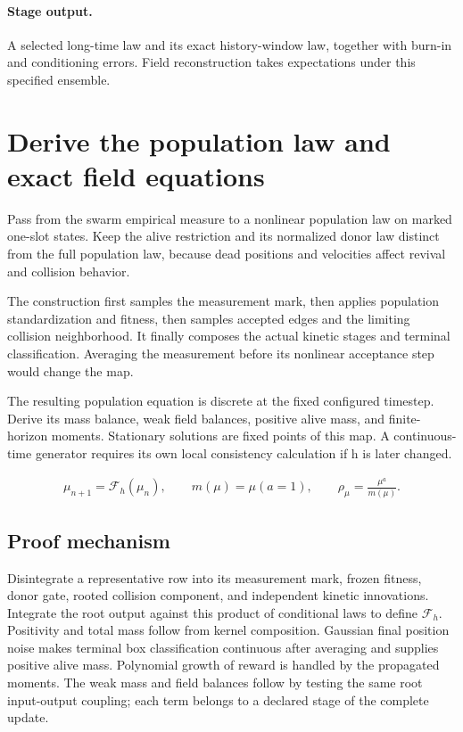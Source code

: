 \documentclass[11pt,a4paper]{article}
\begin{document}
\paragraph{Stage output.} A selected long-time law and its exact history-window law, together with burn-in and conditioning errors. Field reconstruction takes expectations under this specified ensemble.

\section{Derive the population law and exact field equations}
\label{stage:5}
Pass from the swarm empirical measure to a nonlinear population law on marked one-slot states. Keep the alive restriction and its normalized donor law distinct from the full population law, because dead positions and velocities affect revival and collision behavior.

The construction first samples the measurement mark, then applies population standardization and fitness, then samples accepted edges and the limiting collision neighborhood. It finally composes the actual kinetic stages and terminal classification. Averaging the measurement before its nonlinear acceptance step would change the map.

The resulting population equation is discrete at the fixed configured timestep. Derive its mass balance, weak field balances, positive alive mass, and finite-horizon moments. Stationary solutions are fixed points of this map. A continuous-time generator requires its own local consistency calculation if h is later changed.


\begin{gather*}
\mu_{n+1}=\mathcal F_h(\mu_n),\qquad m(\mu)=\mu(a=1),\qquad \rho_\mu=\frac{\mu^a}{m(\mu)}.
\end{gather*}
\subsection*{Proof mechanism}
Disintegrate a representative row into its measurement mark, frozen fitness, donor gate, rooted collision component, and independent kinetic innovations. Integrate the root output against this product of conditional laws to define \(\mathcal F_h\). Positivity and total mass follow from kernel composition. Gaussian final position noise makes terminal box classification continuous after averaging and supplies positive alive mass. Polynomial growth of reward is handled by the propagated moments. The weak mass and field balances follow by testing the same root input-output coupling; each term belongs to a declared stage of the complete update.
\end{document}
